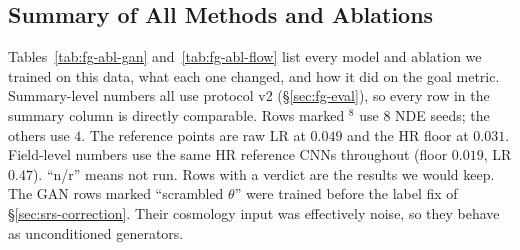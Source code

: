 \subsection{Summary of All Methods and Ablations}
\label{sec:flowgan-ablations}

Tables~\ref{tab:fg-abl-gan} and~\ref{tab:fg-abl-flow} list every model and
ablation we trained on this data, what each one changed, and how it did on the
goal metric. Summary-level numbers all use protocol v2 (\S\ref{sec:fg-eval}), so
every row in the summary column is directly comparable. Rows marked $^8$ use $8$
NDE seeds; the others use $4$. The reference points are raw LR at $0.049$ and the
HR floor at $0.031$. Field-level numbers use the same
HR reference CNNs throughout (floor $0.019$, LR $0.47$). ``n/r'' means not run.
Rows with a  verdict are the results we would keep. The GAN rows
marked ``scrambled $\theta$'' were trained before the label fix of
\S\ref{sec:srs-correction}. Their cosmology input was effectively noise, so they
behave as unconditioned generators.

